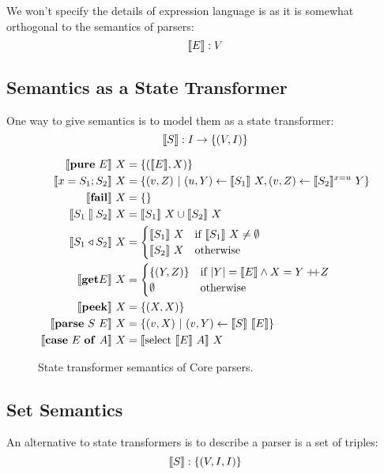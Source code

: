 \documentclass{article}
\begin{document}
We won't specify the details of expression language is as it is
somewhat orthogonal to the semantics of parsers:
\[
\llbracket{E}\rrbracket : V
\]


\subsection{Semantics as a State Transformer}

One way to give semantics is to model them as a state transformer:
\[
\llbracket{S}\rrbracket : I \to \{{ (V,I) }\}
\]

\begin{figure}[H]
\begin{align*}
\llbracket{\mathbf{pure}~{E}}\rrbracket~X &= \{{ (\llbracket{E}\rrbracket, X) }\} \\
\llbracket{{x} = {S_1}; {S_2}}\rrbracket~X &=  \{{ (v,Z) ~|~ (u,Y) \leftarrow \llbracket{S_1}\rrbracket~X,
                                        (v,Z) \leftarrow \llbracket{S_2}\rrbracket^{x=u}~Y }\} \\
\llbracket{\mathbf{fail}}\rrbracket~X   &= \{{ }\} \\
\llbracket{{S_1} \talloblong {S_2}}\rrbracket~X &= \llbracket{S_1}\rrbracket~X \cup \llbracket{S_2}\rrbracket~X \\
\llbracket{{S_1} \triangleleft {S_2}}\rrbracket~X &=
  \begin{cases}
  \llbracket{S_1}\rrbracket~X &\text{if}~\llbracket{S_1}\rrbracket~X \neq \emptyset \\
  \llbracket{S_2}\rrbracket~X &\text{otherwise}
  \end{cases} \\
\llbracket{\mathbf{get}{E}}\rrbracket~X &=
  \begin{cases}
  \{{ (Y,Z) }\} &\text{if}~|Y| = \llbracket{E}\rrbracket \wedge X = Y +\!\!\!+ Z \\
  \emptyset     &\text{otherwise}
  \end{cases} \\
\llbracket{\mathbf{peek}}\rrbracket~X &= \{{(X,X)}\} \\
\llbracket{\mathbf{parse}~{S}~{E}}\rrbracket~X &= \{{ (v,X) ~|~ (v,Y) \leftarrow \llbracket{S}\rrbracket~\llbracket{E}\rrbracket }\} \\
\llbracket{\mathbf{case}~{E}~\mathbf{of}~{A}}\rrbracket~X &= \llbracket{\mathrm{select}~{\llbracket{E}\rrbracket}~{A}}\rrbracket~X
\end{align*}
\caption{State transformer semantics of Core parsers.}
\end{figure}




\subsection{Set Semantics}

An alternative to state transformers is to describe a parser is a set
of triples:
\[
\llbracket{S}\rrbracket : \{{ (V,I,I) }\}
\]
\end{document}
